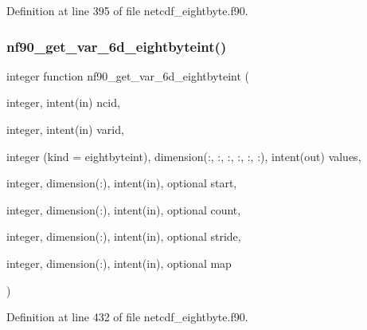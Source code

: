 Definition at line 395 of file netcdf\+\_\+eightbyte.\+f90.

\mbox{\label{netcdf__eightbyte_8f90_a98c01b59edd61dfa5608ab76dbac07ef}} 
\subsubsection{\texorpdfstring{nf90\+\_\+get\+\_\+var\+\_\+6d\+\_\+eightbyteint()}{nf90\_get\_var\_6d\_eightbyteint()}}
{\footnotesize\ttfamily integer function nf90\+\_\+get\+\_\+var\+\_\+6d\+\_\+eightbyteint (\begin{DoxyParamCaption}\item[{integer, intent(in)}]{ncid,  }\item[{integer, intent(in)}]{varid,  }\item[{integer (kind = eightbyteint), dimension(\+:, \+:, \+:, \+:, \+:, \+:), intent(out)}]{values,  }\item[{integer, dimension(\+:), intent(in), optional}]{start,  }\item[{integer, dimension(\+:), intent(in), optional}]{count,  }\item[{integer, dimension(\+:), intent(in), optional}]{stride,  }\item[{integer, dimension(\+:), intent(in), optional}]{map }\end{DoxyParamCaption})}



Definition at line 432 of file netcdf\+\_\+eightbyte.\+f90.

\mbox{\label{netcdf__eightbyte_8f90_aa72f717e4c1e4bba1378e0c40c310ce3}} 
